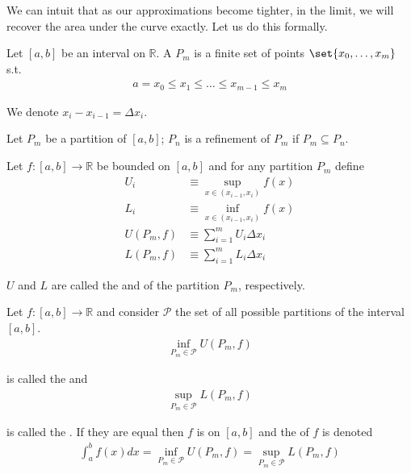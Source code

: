 \documentclass{article}
\begin{document}
We can intuit that as our approximations become tighter, in the limit, we will recover the area under the curve exactly. Let us do this formally.
\begin{definition}
  Let $[a, b]$ be an interval on $\mathbb{R}$. A  $P_m$ is a finite set of points $\set{x_0, \ldots, x_m}$ s.t.
  \begin{align*}
    a = x_0 \le x_1 \le \ldots \le x_{m - 1} \le x_m
  \end{align*}

  We denote $x_{i} - x_{i - 1} = \Delta x_i$.
\end{definition}

\begin{definition}
  Let $P_m$ be a partition of $[a, b]$; $P_n$ is a refinement of $P_m$ if $P_m \subseteq P_n$.
\end{definition}

\begin{definition}
  Let $f: [a, b] \to \mathbb{R}$ be bounded on $[a, b]$ and for any partition $P_m$ define
  \begin{align*}
    U_i & \equiv \sup_{x \in (x_{i - 1}, x_i)} f(x)
    \\
    L_i & \equiv \inf_{x \in (x_{i - 1}, x_i)} f(x)
    \\
    U(P_m, f) & \equiv \sum^{m}_{i = 1} U_i \Delta x_i
    \\
    L(P_m, f) & \equiv \sum^{m}_{i = 1} L_i \Delta x_i
  \end{align*}

  $U$ and $L$ are called the  and  of the partition $P_m$, respectively.
\end{definition}

\begin{definition}
  Let $f: [a, b] \to \mathbb{R}$ and consider $\mathcal{P}$ the set of all possible partitions of the interval $[a, b]$.
  \begin{align*}
    \inf_{P_m \in \mathcal{P}} U(P_m, f)
  \end{align*}

  is called the  and
  \begin{align*}
    \sup_{P_m \in \mathcal{P}} L(P_m, f)
  \end{align*}

  is called the . If they are equal then $f$ is  on $[a, b]$  and the  of $f$ is denoted
  \begin{align*}
    \int_{a}^{b} f(x) dx
    =
    \inf_{P_m \in \mathcal{P}} U(P_m, f)
    =
    \sup_{P_m \in \mathcal{P}} L(P_m, f)
  \end{align*}
\end{definition}
\end{document}
